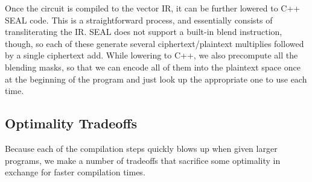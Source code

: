 Once the circuit is compiled to the vector IR, it can be further lowered to C++ SEAL code.
This is a straightforward process, and essentially consists of transliterating the IR. 
SEAL does not support a built-in blend instruction, though, so each of these generate several ciphertext/plaintext multiplies followed by a single ciphertext add.
While lowering to C++, we also precompute all the blending masks, so that we can encode all of them into the plaintext space once at the beginning of the program and just look up the appropriate one to use each time.


\subsection{Optimality Tradeoffs}\label{sec:optimality-tradeoffs}
Because each of the compilation steps quickly blows up when given larger programs, we make a number of tradeoffs that sacrifice some optimality in exchange for faster compilation times.
